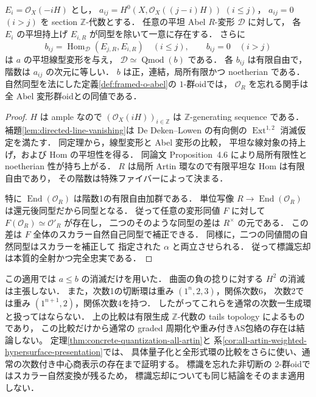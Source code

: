 \begin{proposition}
\label{prop:directed-section-deformation}
$E_i=\mathcal O_X(-iH)$ とし，
$a_{ij}=H^0(X,\mathcal O_X((j-i)H))$ $(i\leq j)$，
$a_{ij}=0$ $(i>j)$ を section $\mathbb Z$-代数とする．
任意の平坦 Abel $R$-変形 $\mathcal D$ に対して，
各 $E_i$ の平坦持上げ $E_{i,R}$ が同型を除いて一意に存在する．
さらに
\[
 b_{ij}=\operatorname{Hom}_{\mathcal D}(E_{j,R},E_{i,R})
 \quad(i\leq j),\qquad b_{ij}=0\quad(i>j)
\]
は $a$ の平坦線型変形を与え，
$\mathcal D\simeq\operatorname{Qmod}(b)$ である．
各 $b_{ij}$ は有限自由で，階数は $a_{ij}$ の次元に等しい．
$b$ は正，連結，局所有限かつ noetherian である．
自然同型を法にした定義\ref{def:framed-o-abel}の $1$-群oidでは，
$\mathcal O_R$ を忘れる関手は全 Abel 変形群oidとの同値である．
\end{proposition}
\begin{proof}
$H$ は ample なので $(\mathcal O_X(iH))_{i\in\mathbb Z}$ は
$\mathbb Z$-generating sequence である．
補題\ref{lem:directed-line-vanishing}は
De Deken--Lowen \cite[Theorem~4.5, pp.~495--496]{DDL2011}
の有向側の $\operatorname{Ext}^{1,2}$ 消滅仮定を満たす．
同定理から，線型変形と Abel 変形の比較，
平坦な線対象の持上げ，および Hom の平坦性を得る．
同論文 Proposition~4.6 により局所有限性と noetherian 性が持ち上がる．
$R$ は局所 Artin 環なので有限平坦な Hom は有限自由であり，
その階数は特殊ファイバーによって決まる．

特に $\operatorname{End}(\mathcal O_R)$ は階数1の有限自由加群である．
単位写像 $R\to\operatorname{End}(\mathcal O_R)$ は還元後同型だから同型となる．
従って任意の変形同値 $F$ に対して
$F(\mathcal O_R)\simeq\mathcal O'_R$ が存在し，
二つのそのような同型の差は $R^\times$ の元である．
この差は $F$ 全体のスカラー自然自己同型で補正できる．
同様に，二つの同値間の自然同型はスカラーを補正して
指定された $\alpha$ と両立させられる．
従って標識忘却は本質的全射かつ完全忠実である．
\end{proof}

\begin{remark}[曲面と重み付き生成の注意]
この適用では $a\leq b$ の消滅だけを用いた．
曲面の負の捻りに対する $H^2$ の消滅は主張しない．
また，次数1の切断環は重み $(1^n,2,3)$，関係次数6，
次数2では重み $(1^{n+1},2)$，関係次数4を持つ．
したがってこれらを通常の次数一生成環と扱ってはならない．
上の比較は有限生成 $\mathbb Z$-代数の tails topology によるものであり，
この比較だけから通常の graded 周期化や重み付きAS包絡の存在は結論しない。
定理\ref{thm:concrete-quantization-all-artin}と
系\ref{cor:all-artin-weighted-hypersurface-presentation}では、
具体量子化と全形式環の比較をさらに使い、通常の次数付き中心商表示の存在まで証明する。
標識を忘れた非切断の $2$-群oidではスカラー自然変換が残るため，
標識忘却についても同じ結論をそのまま適用しない．
\end{remark}

